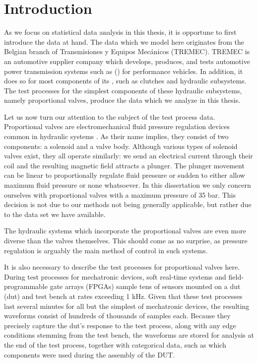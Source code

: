 \chapter{Introduction}

As we focus on statistical data analysis in this thesis, it is opportune to first introduce the data at hand.
The data which we model here originates from the Belgian branch of Transmisiones y Equipos Mecánicos (TREMEC).
TREMEC is an automotive supplier company which develops, produces, and tests automotive power transmission systems such as  () for performance vehicles.
In addition, it does so for most components of its , such as clutches and hydraulic subsystems.
The test processes for the simplest components of these hydraulic subsystems, namely proportional valves, produce the data which we analyze in this thesis.

Let us now turn our attention to the subject of the test process data.
Proportional valves are electromechanical fluid pressure regulation devices common in hydraulic systems \citep{DBLP:journals/tii/MazaevCH21}.
As their name implies, they consist of two components\thinspace: a solenoid and a valve body.
Although various types of solenoid valves exist, they all operate similarly: we send an electrical current through their coil and the resulting magnetic field attracts a plunger.
The plunger movement can be linear to proportionally regulate fluid pressure or sudden to either allow maximum fluid pressure or none whatsoever.
In this dissertation we only concern ourselves with proportional valves with a maximum pressure of 35 bar.
This decision is not due to our methods not being generally applicable, but rather due to the data set we have available.


The hydraulic systems which incorporate the proportional valves are even more diverse than the valves themselves.
This should come as no surprise, as pressure regulation is arguably the main method of control in such systems.

It is also necessary to describe the test processes for proportional valves here.
During test processes for mechatronic devices, soft real-time systems and field-programmable gate arrays (FPGAs) sample tens of sensors mounted on a \acrlong{dut} (\acrshort{dut}) and test bench at rates exceeding 1 kHz.
Given that these test processes last several minutes for all but the simplest of mechatronic devices, the resulting waveforms consist of hundreds of thousands of samples each.
Because they precisely capture the \acrshort{dut}’s response to the test process, along with any edge conditions stemming from the test bench, the waveforms are stored for analysis at the end of the test process, together with categorical data, such as which components were used during the assembly of the DUT.\@

